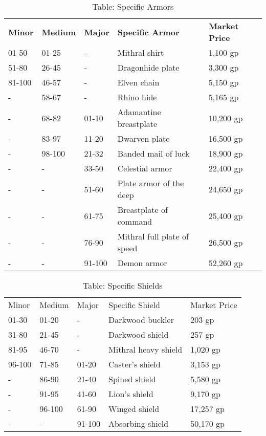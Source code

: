 \begin{table}[]
\sffamily
\caption{Table: Specific Armors}
\begin{tabular}{lllll}
\textbf{Minor} & \textbf{Medium} & \textbf{Major} & \textbf{Specific Armor} & \textbf{Market Price}\\
01-50 & 01-25 & - & Mithral shirt  & 1,100 gp\\
51-80 & 26-45 & - & Dragonhide plate  & 3,300 gp\\
81-100 & 46-57 & - & Elven chain  & 5,150 gp\\
- & 58-67 & - & Rhino hide  & 5,165 gp\\
- & 68-82 & 01-10 & Adamantine breastplate & 10,200 gp\\
- & 83-97 & 11-20 & Dwarven plate  & 16,500 gp\\
- & 98-100 & 21-32 & Banded mail of luck & 18,900 gp\\
- & - & 33-50 & Celestial armor  & 22,400 gp\\
- & - & 51-60 & Plate armor of the deep & 24,650 gp\\
- & - & 61-75 & Breastplate of command & 25,400 gp\\
- & - & 76-90 & Mithral full plate of speed & 26,500 gp\\
- & - & 91-100 & Demon armor  & 52,260 gp\\
\end{tabular}
\end{table}
\begin{table}[]
\sffamily
\caption{Table: Specific Shields}
\begin{tabular}{lllll}
Minor & Medium & Major & Specific Shield & Market Price\\
01-30 & 01-20 & - & Darkwood buckler & 203 gp\\
31-80 & 21-45 & - & Darkwood shield & 257 gp\\
81-95 & 46-70 & - & Mithral heavy shield & 1,020 gp\\
96-100 & 71-85 & 01-20 & Caster's shield & 3,153 gp\\
- & 86-90 & 21-40 & Spined shield & 5,580 gp\\
- & 91-95 & 41-60 & Lion's shield & 9,170 gp\\
- & 96-100 & 61-90 & Winged shield & 17,257 gp\\
- & - & 91-100 & Absorbing shield & 50,170 gp\\
\end{tabular}
\end{table}

